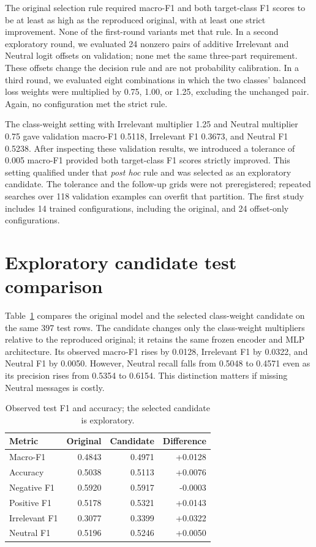The original selection rule required macro-F1 and both target-class F1 scores to be at least as high as the reproduced original, with at least one strict improvement. None of the first-round variants met that rule. In a second exploratory round, we evaluated 24 nonzero pairs of additive Irrelevant and Neutral logit offsets on validation; none met the same three-part requirement. These offsets change the decision rule and are not probability calibration. In a third round, we evaluated eight combinations in which the two classes' balanced loss weights were multiplied by 0.75, 1.00, or 1.25, excluding the unchanged pair. Again, no configuration met the strict rule.

The class-weight setting with Irrelevant multiplier 1.25 and Neutral multiplier 0.75 gave validation macro-F1 0.5118, Irrelevant F1 0.3673, and Neutral F1 0.5238. After inspecting these validation results, we introduced a tolerance of 0.005 macro-F1 provided both target-class F1 scores strictly improved. This setting qualified under that \emph{post hoc} rule and was selected as an exploratory candidate. The tolerance and the follow-up grids were not preregistered; repeated searches over 118 validation examples can overfit that partition. The first study includes 14 trained configurations, including the original, and 24 offset-only configurations.

\section{Exploratory candidate test comparison}
Table~\ref{tab:final} compares the original model and the selected class-weight candidate on the same 397 test rows. The candidate changes only the class-weight multipliers relative to the reproduced original; it retains the same frozen encoder and MLP architecture. Its observed macro-F1 rises by 0.0128, Irrelevant F1 by 0.0322, and Neutral F1 by 0.0050. However, Neutral recall falls from 0.5048 to 0.4571 even as its precision rises from 0.5354 to 0.6154. This distinction matters if missing Neutral messages is costly.

\begin{table}[htbp]
\centering
\caption{Observed test F1 and accuracy; the selected candidate is exploratory.}
\label{tab:final}
\begin{tabular}{lrrr}
\toprule
Metric & Original & Candidate & Difference \\
\midrule
Macro-F1 & 0.4843 & 0.4971 & +0.0128 \\
Accuracy & 0.5038 & 0.5113 & +0.0076 \\
Negative F1 & 0.5920 & 0.5917 & -0.0003 \\
Positive F1 & 0.5178 & 0.5321 & +0.0143 \\
Irrelevant F1 & 0.3077 & 0.3399 & +0.0322 \\
Neutral F1 & 0.5196 & 0.5246 & +0.0050 \\
\bottomrule
\end{tabular}
\end{table}

